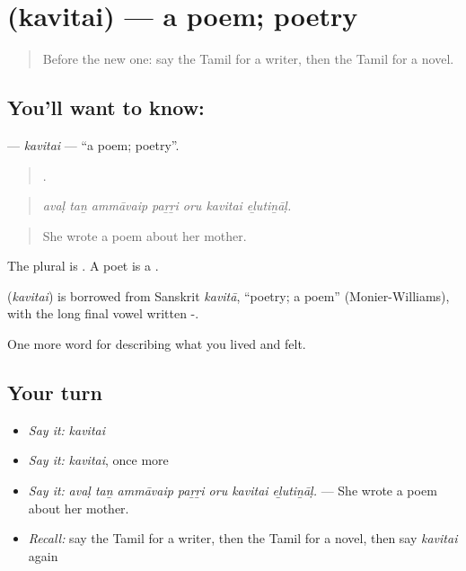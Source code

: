 \section[\texorpdfstring{\ta{கவிதை} (kavitai)}{கவிதை (kavitai)}]{ (kavitai) — a poem; poetry}

\label{lesson:TA-C528-kavitai}



\begin{quote}
Before the new one: say the Tamil for a writer, then the Tamil for a novel.
\end{quote}

\subsection*{You'll want to know: }
\textbf{} — \emph{kavitai} — \textquotedblleft{}a poem; poetry\textquotedblright{}.

\begin{quote}
      .
\end{quote}

\begin{quote}
\emph{avaḷ taṉ ammāvaip paṟṟi oru kavitai eḻutiṉāḷ.}
\end{quote}

\begin{quote}
She wrote a poem about her mother.
\end{quote}

The plural is . A poet is a .

\begin{cousinweb}
\textbf{} (\emph{kavitai}) is borrowed from Sanskrit \emph{kavitā}, \textquotedblleft{}poetry; a poem\textquotedblright{} (Monier-Williams), with the long final vowel written -.
\end{cousinweb}

\begin{grammarlens}[title={What you've built}]
One more word for describing what you lived and felt.
\end{grammarlens}

\subsection*{Your turn}
\begin{itemize}
\raggedright
  \item \emph{Say it:} \emph{kavitai}
  \item \emph{Say it:} \emph{kavitai}, once more
  \item \emph{Say it:} \emph{avaḷ taṉ ammāvaip paṟṟi oru kavitai eḻutiṉāḷ.} — She wrote a poem about her mother.
  \item \emph{Recall:} say the Tamil for a writer, then the Tamil for a novel, then say \emph{kavitai} again
\end{itemize}

